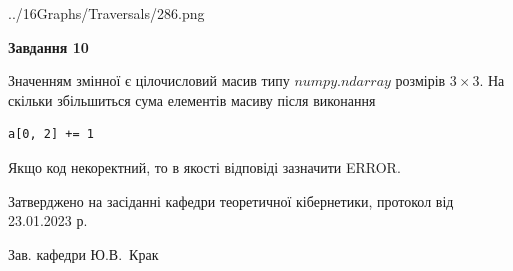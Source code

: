 \documentclass[12pt, ukrainian]{article}
\begin{document}
{\begin {large}
\begin{center}
	{../16Graphs/Traversals/286.png}
\end{center}\par
\newpage

{\begin {center}\textbf{Завдання 10}\end {center}}\par
Значенням змінної  є цілочисловий масив типу $numpy.ndarray$ розмірів $3{\times}3$. На скільки збільшиться сума елементів масиву  після виконання
\begin{verbatim}
a[0, 2] += 1
\end{verbatim}


Якщо код некоректний, то в якості відповіді зазначити ERROR.\par
\newpage


\end {large}
}
{\smallskip \begin {small} Затверджено на засіданні кафедри теоретичної кібернетики, протокол  від   23.01.2023 р.\par\smallskip\smallskip
{\parbox {6.5 cm}{Зав. кафедри \dotfill Ю.В.~Крак}} \end{small}}
\end{document}
